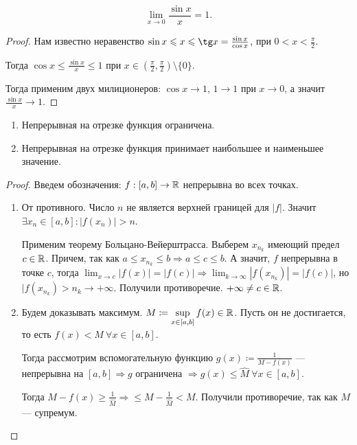 \begin{theorem}
    \[
        \lim_{x\to 0} \frac{\sin x}{x} = 1
    .\] 
\end{theorem}
\begin{proof}
    Нам известно неравенство $\sin x \le x \le \tg x = \frac{\sin x}{\cos x}$, при $0 < x < \frac{\pi}{2}$. 

    Тогда $\cos x \le \frac{\sin x}{x} \le 1$ при $x \in \left(\frac{\pi}{2}, \frac{\pi}{2}\right) \setminus \{0\}$.

    Тогда применим двух милиционеров: $\cos x \to 1$,  $1 \to 1$ при $x\to 0$, а значит  $\frac{\sin x}{x} \to 1$.
\end{proof}
\begin{theorem}
\slashn
\begin{enumerate}
    \item Непрерывная на отрезке функция ограничена.
    \item Непрерывная на отрезке функция принимает наибольшее и наименьшее значение.
\end{enumerate}
\end{theorem}
\begin{proof}
    Введем обозначения: $f: [a, b] \to \mathbb{R}$ непрерывна во всех точках.
    \begin{enumerate}
        \item От противного. Число $n$ не является верхней границей для  $|f|$. Значит  $\exists x_n \in [a, b]\!: |f(x_n)| > n$.  

            Применим теорему Больцано-Вейерштрасса. Выберем $x_{n_k}$ имеющий предел  $c \in \mathbb{R}$. Причем, так как  $a \le x_{n_k} \le b \Rightarrow a \le c \le b$. А значит, $f$ непрерывна в точке  $c$, тогда  $\displaystyle \lim_{x\to c}|f(x)| = |f(c)| \Rightarrow \lim_{k \to \infty} |f(x_{n_k})| = |f(c)|$, но $|f(x_{n_k}) > n_k \to +\infty$. Получили противоречие.  $+\infty \neq c \in \mathbb{R}$.
        \item Будем доказывать максимум.  $\displaystyle M \coloneqq \sup_{x \in [a ,b]} f(x) \in \mathbb{R}$. Пусть он не достигается, то есть $f(x) < M\ \forall x \in [a, b]$. 

            Тогда рассмотрим вспомогательную функцию $g(x) \coloneqq \frac{1}{M - f(x)}$ --- непрерывна на $[a, b] \Rightarrow g$ ограничена  $\Rightarrow g(x) \le \widehat{M}\ \forall x \in [a, b]$.

            Тогда $M - f(x) \ge \frac{1}{\widehat{M}} \Rightarrow \le M - \frac{1}{\widehat{M}} < M$. Получили противоречие, так как $M$ --- супремум.
    \end{enumerate}
\end{proof}
